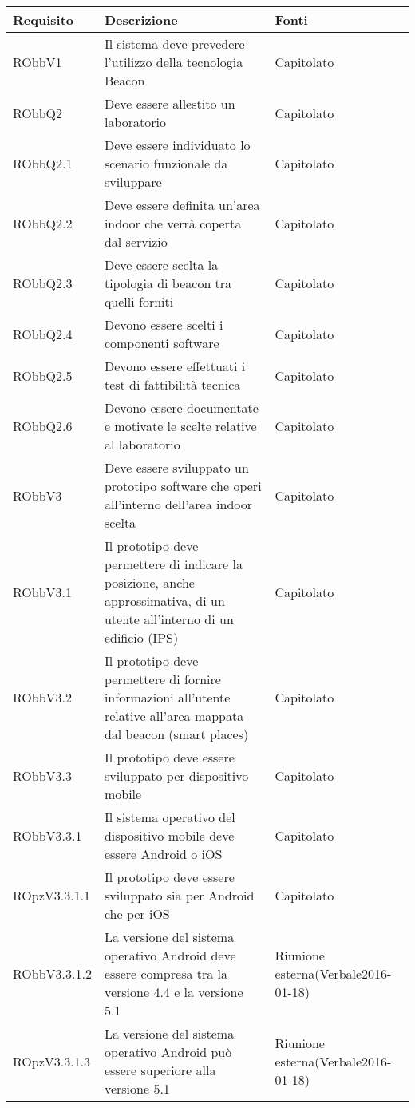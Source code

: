 \documentclass[../AnalisiDeiRequisiti.tex]{subfiles}
\begin{document}
\begin{longtabu} to \textwidth {X X[2] X}
	\toprule
	\textbf{Requisito} & \textbf{Descrizione} & \textbf{Fonti}\\
	\midrule
	\endhead
	RObbV1 & Il sistema deve prevedere l'utilizzo della tecnologia Beacon & Capitolato \\ 
	\midrule 
	RObbQ2 & Deve essere allestito un laboratorio & Capitolato \\ 
	\midrule 
	RObbQ2.1 & Deve essere individuato lo scenario funzionale da sviluppare & Capitolato \\ 
	\midrule 
	RObbQ2.2 & Deve essere definita un'area indoor che verrà coperta dal servizio & Capitolato \\ 
	\midrule 
	RObbQ2.3 & Deve essere scelta la tipologia di beacon tra quelli forniti & Capitolato \\ 
	\midrule 
	RObbQ2.4 & Devono essere scelti i componenti software & Capitolato \\ 
	\midrule 
	RObbQ2.5 & Devono essere effettuati i test di fattibilità tecnica & Capitolato \\ 
	\midrule 
	RObbQ2.6 & Devono essere documentate e motivate le scelte relative al laboratorio & Capitolato \\ 
	\midrule 
	RObbV3 & Deve essere sviluppato un prototipo software che operi all'interno dell'area indoor scelta & Capitolato \\ 
	\midrule 
	RObbV3.1 & Il prototipo deve permettere di indicare la posizione, anche approssimativa, di un utente all'interno di un edificio (IPS) & Capitolato \\ 
	\midrule 
	RObbV3.2 & Il prototipo deve permettere di fornire informazioni all'utente relative all'area mappata dal beacon (smart places) & Capitolato \\ 
	\midrule 
	RObbV3.3 & Il prototipo deve essere sviluppato per dispositivo mobile & Capitolato \\ 
	\midrule
	RObbV3.3.1 & Il sistema operativo del dispositivo mobile deve essere Android o iOS & Capitolato \\ 
	\midrule 
	ROpzV3.3.1.1 & Il prototipo deve essere sviluppato sia per Android che per iOS & Capitolato \\ 
	\midrule 
	RObbV3.3.1.2 & La versione del sistema operativo Android deve essere compresa tra la versione 4.4 e la versione 5.1 & Riunione esterna(Verbale2016-01-18) \\ 
	\midrule 
	ROpzV3.3.1.3 & La versione del sistema operativo Android può essere superiore alla versione 5.1 & Riunione esterna(Verbale2016-01-18) \\ 

\end{longtabu}
\end{document}
